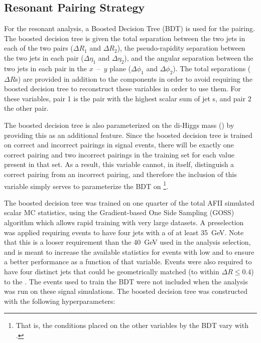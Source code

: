 \subsection{Resonant Pairing Strategy}

For the resonant analysis, a Boosted Decision Tree (BDT) is used for the pairing.
The boosted decision tree is given the total separation between the two jets in
each of the two pairs ($\Delta R_{1}$ and $\Delta R_{2}$), the pseudo-rapidity
separation between the two jets in each pair ($\Delta \eta_{1}$ and
$\Delta \eta_{2}$), and the angular separation between the two jets in each pair
in the $x$~--~$y$ plane ($\Delta \phi_{1}$ and $\Delta \phi_{2}$). The total
separations ($\Delta R$s) are provided in addition to the components in order to
avoid requiring the boosted decision tree to reconstruct these variables in
order to use them. For these variables, pair 1 is the pair with the highest
scalar sum of jet \pt{}s, and pair 2 the other pair.

The boosted decision tree is also parameterized on the di-Higgs mass (\mhh)
by providing this as an additional feature. Since the boosted decision tree is
trained on correct and incorrect pairings in signal events, there will be exactly one
correct pairing and two incorrect pairings in the training set for each \mhh
value present in that set. As a result, this variable cannot, in itself,
distinguish a correct pairing from an incorrect pairing, and therefore the
inclusion of this variable simply serves to parameterize the BDT on
\mhh\footnote{That is, the conditions placed on the other variables by the BDT
	vary with \mhh.}.

The boosted decision tree was trained on one quarter of the total AFII
simulated scalar MC statistics, using the Gradient-based One Side Sampling
(GOSS) algorithm which allows rapid training with very large datasets. A
preselection was applied requiring events to have four jets with a \pt of at
least \SI{35}{\GeV}. Note that this is a looser requirement than the
\SI{40}{\GeV} used in the analysis selection, and is meant to increase the
available statistics for events with low \mhh and to ensure a better
performance as a function of that variable. Events were also required to have
four distinct jets that could be geometrically matched (to within
$\Delta R \leq 0.4$) to the \bquarks. The events used to train the BDT were
not included when the analysis was run on these signal simulations. The
boosted decision tree was constructed with the following hyperparameters:\\

